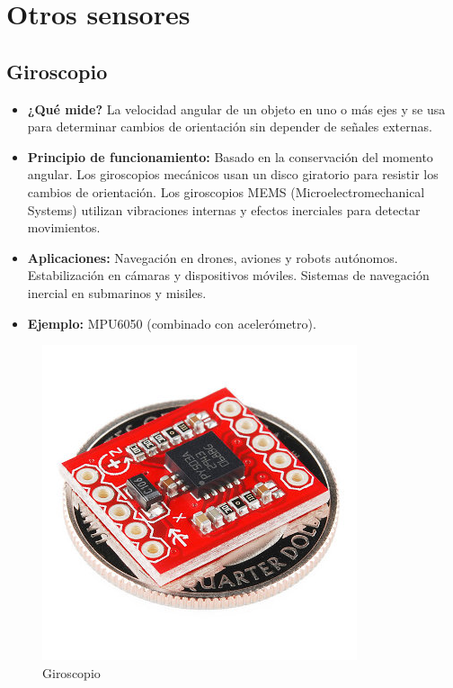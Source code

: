 \section{Otros sensores}

\subsection*{Giroscopio}
\begin{itemize}
	\item \textbf{¿Qué mide?} La velocidad angular de un objeto en uno o más ejes y se usa para determinar cambios de orientación sin depender de señales externas.
	\item \textbf{Principio de funcionamiento:} Basado en la conservación del momento angular.
	Los giroscopios mecánicos usan un disco giratorio para resistir los cambios de orientación.
	Los giroscopios MEMS (Microelectromechanical Systems) utilizan vibraciones internas y efectos inerciales para detectar movimientos.
	
	\item \textbf{Aplicaciones:} Navegación en drones, aviones y robots autónomos.
	Estabilización en cámaras y dispositivos móviles.
	Sistemas de navegación inercial en submarinos y misiles.
	\item \textbf{Ejemplo:} MPU6050 (combinado con acelerómetro).
\end{itemize}
\begin{figure}[h]
	\centering
	\includegraphics[width=0.3\linewidth]{img/giroscopio}
	\caption{Giroscopio}
	\label{fig:giroscopio}
\end{figure}


